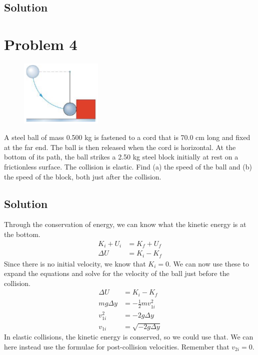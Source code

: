 \documentclass[12pt]{article}
\begin{document}
\subsection*{Solution}


\pagebreak
\section*{Problem 4}
\begin{figure}
    \vspace{-30pt}
    \includegraphics[width=0.35\textwidth]{graph_4.png} 
\end{figure}
A steel ball of mass 0.500 kg is fastened to a cord that is 70.0 cm long and fixed at the far end. The
ball is then released when the cord is horizontal. At the bottom of its path, the ball strikes a 2.50 kg steel
block initially at rest on a frictionless surface. The collision is elastic. Find (a) the speed of the ball and
(b) the speed of the block, both just after the collision.

\subsection*{Solution}
Through the conservation of energy, we can know what the kinetic energy is at the bottom.
\begin{align*}
    K_i + U_i &= K_f + U_f\\
    \Delta U &= K_i - K_f
\end{align*}
Since there is no initial velocity, we know that $K_i = 0$. We can now use these to expand the equations and solve for the velocity  of the ball just before the collision.
\begin{align*}
    \Delta U &= K_i - K_f\\
    mg\Delta y  &=  -\frac{1}{2}mv_{1i}^2\\
    v_{1i}^2 &=  -2g\Delta y\\
    v_{1i}   &=  \sqrt{-2g\Delta y}
\end{align*}
In elastic collisions, the kinetic energy is conserved, so we could use that. We can here instead use the formulae for post-collision velocities. Remember that $v_{2i} = 0$.
\end{document}
